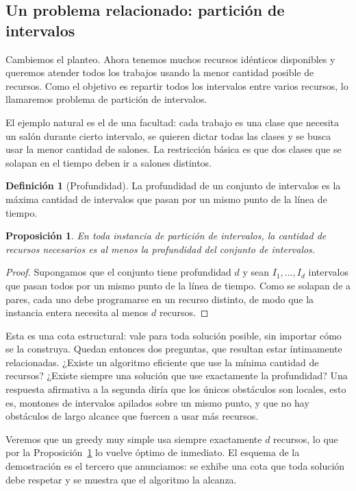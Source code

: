 \documentclass[12pt, spanish, oneside, openany]{book}
\theoremstyle{uprightplain}
\newtheorem{proposicion}[teorema]{Proposición}
\theoremstyle{definition}
\newtheorem{definicion}[teorema]{Definición}
\theoremstyle{remark}
\theoremstyle{definition}
\begin{document}
\subsection{Un problema relacionado: partición de intervalos}
\label{subsec:particion-intervalos}

Cambiemos el planteo. Ahora tenemos muchos recursos idénticos disponibles y queremos atender todos los trabajos usando la menor cantidad posible de recursos. Como el objetivo es repartir todos los intervalos entre varios recursos, lo llamaremos problema de partición de intervalos.

El ejemplo natural es el de una facultad: cada trabajo es una clase que necesita un salón durante cierto intervalo, se quieren dictar todas las clases y se busca usar la menor cantidad de salones. La restricción básica es que dos clases que se solapan en el tiempo deben ir a salones distintos.

\begin{definicion}[Profundidad]
\label{def:profundidad}
La profundidad de un conjunto de intervalos es la máxima cantidad de intervalos que pasan por un mismo punto de la línea de tiempo.
\end{definicion}

\begin{proposicion}
\label{prop:cota-profundidad}
En toda instancia de partición de intervalos, la cantidad de recursos necesarios es al menos la profundidad del conjunto de intervalos.
\end{proposicion}
\begin{proof}
Supongamos que el conjunto tiene profundidad $d$ y sean $I_1,\dots,I_d$ intervalos que pasan todos por un mismo punto de la línea de tiempo. Como se solapan de a pares, cada uno debe programarse en un recurso distinto, de modo que la instancia entera necesita al menos $d$ recursos.
\end{proof}

Esta es una cota estructural: vale para toda solución posible, sin importar cómo se la construya. Quedan entonces dos preguntas, que resultan estar íntimamente relacionadas. ¿Existe un algoritmo eficiente que use la mínima cantidad de recursos? ¿Existe siempre una solución que use exactamente la profundidad? Una respuesta afirmativa a la segunda diría que los únicos obstáculos son locales, esto es, montones de intervalos apilados sobre un mismo punto, y que no hay obstáculos de largo alcance que fuercen a usar más recursos.

Veremos que un greedy muy simple usa siempre exactamente $d$ recursos, lo que por la Proposición~\ref{prop:cota-profundidad} lo vuelve óptimo de inmediato. El esquema de la demostración es el tercero que anunciamos: se exhibe una cota que toda solución debe respetar y se muestra que el algoritmo la alcanza.
\end{document}
